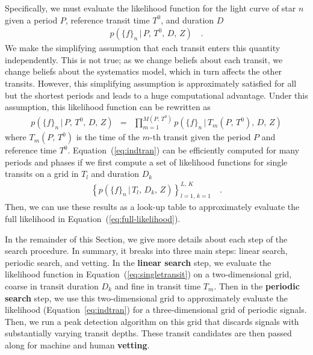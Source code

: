 \documentclass[12pt,preprint]{aastex}
\newcommand{\Eq}[1]{Equation~(\ref{eq:#1})}
\newcommand{\eq}[1]{\Eq{#1}}
\newcommand{\eqalt}[1]{Equation~\ref{eq:#1}}
\newcommand{\eqlabel}[1]{\label{eq:#1}}
\newcommand{\sectionname}{Section}
\newcommand{\flux}{{\ensuremath{f}}}
\newcommand{\period}{{\ensuremath{P}}}
\newcommand{\phase}{{\ensuremath{T^0}}}
\newcommand{\duration}{{\ensuremath{D}}}
\newcommand{\depth}{{\ensuremath{Z}}}
\newcommand{\transittime}{{\ensuremath{T}}}
\begin{document}
Specifically, we must evaluate the likelihood function for the light curve of
star $n$ given a period \period, reference transit time \phase, and duration
\duration
\begin{eqnarray}\eqlabel{full-likelihood}
p(\{\flux\}_n\,|\,\period,\,\phase,\,\duration,\,\depth) \quad.
\end{eqnarray}
We make the simplifying assumption that each transit enters this quantity
independently.
This is not true; as we change beliefs about each transit, we change beliefs
about the systematics model, which in turn affects the other transits.
However, this simplifying assumption
is approximately satisfied for all but the shortest
periods and leads to a huge computational advantage.
Under this assumption, this likelihood function can be rewritten as
\begin{eqnarray}\eqlabel{indtran}
p(\{\flux\}_n\,|\,\period,\,\phase,\,\duration,\,\depth) &=&
\prod_{m=1}^{M(\period,\,\phase)}
    p(\{\flux\}_n\,|\,\transittime_m(\period,\,\phase),\,\duration,\,
                    \depth)
\end{eqnarray}
where $\transittime_m(\period,\,\phase)$ is the time of the $m$-th
transit given the period $\period$ and reference time $\phase$.
\Eq{indtran} can be efficiently computed for many periods and phases if we
first compute a set of likelihood functions for single transits on a grid
in $\transittime_l$ and duration $\duration_k$
\begin{eqnarray}\eqlabel{singletransit}
\left \{ p(\{\flux\}_n\,|\,\transittime_l,\,\duration_k,\,\depth)
\right\}_{l=1,\,k=1}^{L,\,K} \quad.
\end{eqnarray}
Then, we can use these results as a look-up table to approximately evaluate
the full likelihood in
\eq{full-likelihood}.

In the remainder of this \sectionname, we give more details about each step of the
search procedure.
In summary, it breaks into three main steps: linear
search, periodic search, and vetting.
In the {\bf linear search} step, we evaluate the likelihood function in
\eq{singletransit} on a two-dimensional grid, coarse in transit duration
$\duration_k$ and fine in transit time $\transittime_m$.
Then in the {\bf periodic search} step, we use this two-dimensional grid to
approximately evaluate the likelihood (\eqalt{indtran}) for a
three-dimensional grid of periodic signals.
Then, we run a peak detection algorithm on this grid that discards signals
with substantially varying transit depths.
These transit candidates are then passed along for machine and human {\bf
vetting}.
\end{document}
